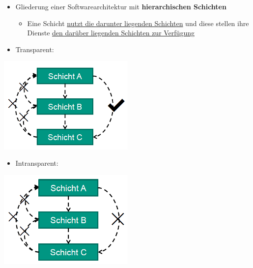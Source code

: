 			\begin{itemize}
				\item Gliederung einer Softwarearchitektur mit \textbf{hierarchischen Schichten}
				\begin{itemize}
					\item Eine Schicht \underline{nutzt die darunter liegenden Schichten}  und diese \newline stellen ihre Dienste \underline{den darüber liegenden Schichten zur Verfügung}
				\end{itemize}
				\item Transparent:
			\end{itemize}						
			\begin{center}
				\includegraphics[width=0.5\textwidth]{../images/transparenteSchichtenarchitektur.png}
			\end{center}					
			\newpage
			\begin{itemize}	
				\item Intransparent:	
			\end{itemize}				
			\begin{center}
				\includegraphics[width=0.5\textwidth]{../images/intransparenteSchichtenarchitektur.png}
			\end{center}
			
